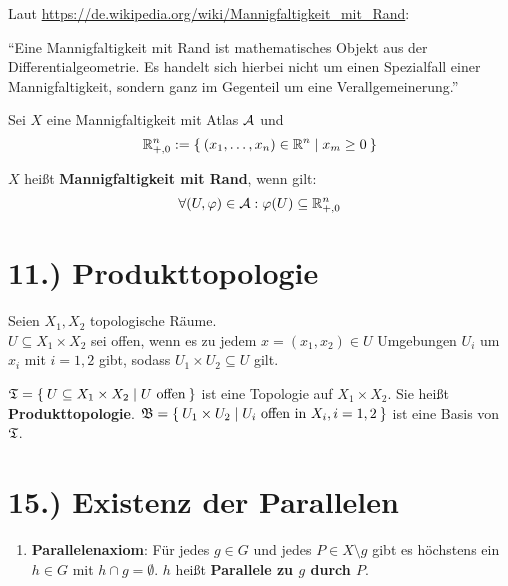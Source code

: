 \documentclass[a5paper,oneside]{scrbook}
\begin{document}

Laut \url{https://de.wikipedia.org/wiki/Mannigfaltigkeit_mit_Rand}:

\enquote{Eine Mannigfaltigkeit mit Rand ist mathematisches Objekt aus der Differentialgeometrie. Es handelt sich hierbei nicht um einen Spezialfall einer Mannigfaltigkeit, sondern ganz im Gegenteil um eine Verallgemeinerung.}


\begin{definition}%
    Sei $X$ eine Mannigfaltigkeit mit Atlas $\mathcal{A}$ und
    \[\mathbb{R}_{+,0}^n := \Set{(x_1, \dots, x_n) \in \ensuremath{\mathbb{R}}^n | x_m \geq 0}\]

    $X$ heißt \textbf{Mannigfaltigkeit mit Rand}, wenn gilt:
    \[\forall (U, \varphi) \in \mathcal{A}: \varphi(U) \subseteq \mathbb{R}_{+,0}^n\]
\end{definition}

\section*{11.) Produkttopologie}
\begin{definition}%
    Seien $X_1, X_2$ topologische Räume.\\
    $U \subseteq X_1 \times X_2$ sei offen, wenn es zu jedem $x = (x_1, x_2) \in U$
    Umgebungen $U_i$ um $x_i$  mit $i=1,2$ gibt, sodass $U_1 \times U_2 \subseteq U$
    gilt.

    $\mathfrak{T} = \Set{U \subseteq X_1 \times X_2 | U \text{ offen}}$
    ist eine Topologie auf $X_1 \times X_2$. Sie heißt \textbf{Produkttopologie}.
    $\mathfrak{B} = \Set{U_1 \times U_2 | U_i \text{ offen in } X_i, i=1,2}$
    ist eine Basis von $\mathfrak{T}$.
\end{definition}


\section*{15.) Existenz der Parallelen}
\begin{definition}%
    \begin{enumerate}[label=§\arabic*),ref=§\arabic*,start=5]
        \item \label{axiom:5}\textbf{Parallelenaxiom}:
            Für jedes $g \in G$ und jedes
            $P \in X \setminus g$ gibt es höchstens ein $h \in G$ mit
            $h \cap g = \emptyset$. $h$ heißt \textbf{Parallele zu $g$ durch $P$}.
    \end{enumerate}
\end{definition}
\end{document}
